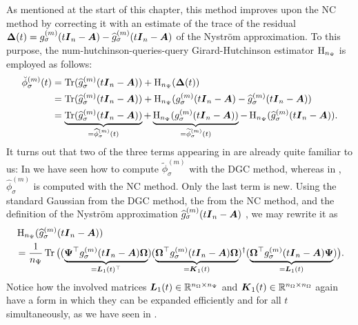 As mentioned at the start of this chapter, this method improves
upon the \gls{NC} method by correcting it with an estimate of the trace of the
residual $\boldsymbol{\Delta}(t) = g_{\sigma}^{(m)}(t\boldsymbol{I}_n - \boldsymbol{A}) - \widehat{g}_{\sigma}^{(m)}(t\boldsymbol{I}_n - \boldsymbol{A})$
of the Nystr\"om approximation. To this purpose, the \gls{num-hutchinson-queries}-query
Girard-Hutchinson estimator $\operatorname{H}_{n_{\Psi}}$
 is employed as follows:
\begin{align}
    \breve{\phi}_{\sigma}^{(m)}(t)
    &= \operatorname{Tr}(\widehat{g}_{\sigma}^{(m)}(t\boldsymbol{I}_n - \boldsymbol{A}))
    + \operatorname{H}_{n_{\Psi}}(\boldsymbol{\Delta}(t)) \notag \\
    &= \operatorname{Tr}(\widehat{g}_{\sigma}^{(m)}(t\boldsymbol{I}_n - \boldsymbol{A}))
    + \operatorname{H}_{n_{\Psi}}(g_{\sigma}^{(m)}(t\boldsymbol{I}_n - \boldsymbol{A}) - \widehat{g}_{\sigma}^{(m)}(t\boldsymbol{I}_n - \boldsymbol{A})) \notag \\
    &= \underbrace{\operatorname{Tr}(\widehat{g}_{\sigma}^{(m)}(t\boldsymbol{I}_n - \boldsymbol{A}))}_{=\widehat{\phi}_{\sigma}^{(m)}(t)}
    + \underbrace{\operatorname{H}_{n_{\Psi}}(g_{\sigma}^{(m)}(t\boldsymbol{I}_n - \boldsymbol{A}))}_{=\widetilde{\phi}_{\sigma}^{(m)}(t)}
    - \operatorname{H}_{n_{\Psi}}(\widehat{g}_{\sigma}^{(m)}(t\boldsymbol{I}_n - \boldsymbol{A})).
    \label{equ:4-nystromchebyshev-spectral-density-decomposition}
\end{align}
It turns out that two of the three terms appearing in 
are already quite familiar to us: In  we have seen
how to compute $\widetilde{\phi}_{\sigma}^{(m)}$ with the \gls{DGC} method, whereas
in , $\widehat{\phi}_{\sigma}^{(m)}$ is computed with the \gls{NC}
method. Only the last term is new. Using the standard Gaussian 
from the \gls{DGC} method, the  from the \gls{NC} method,
and the definition of the Nystr\"om approximation
$\widehat{g}_{\sigma}^{(m)}(t\boldsymbol{I}_n - \boldsymbol{A})$ ,
we may rewrite it as
\begin{align*}
    &\operatorname{H}_{n_{\Psi}}(\widehat{g}_{\sigma}^{(m)}(t\boldsymbol{I}_n - \boldsymbol{A}))\\
    &=\frac{1}{n_{\Psi}}\operatorname{Tr}\big(
        (\underbrace{\boldsymbol{\Psi}^{\top} g_{\sigma}^{(m)}(t\boldsymbol{I}_n - \boldsymbol{A}) \boldsymbol{\Omega}}_{=\boldsymbol{L}_1(t)^{\top}})
        (\underbrace{\boldsymbol{\Omega}^{\top} g_{\sigma}^{(m)}(t\boldsymbol{I}_n - \boldsymbol{A}) \boldsymbol{\Omega}}_{=\boldsymbol{K}_1(t)})^{\dagger}
        (\underbrace{\boldsymbol{\Omega}^{\top} g_{\sigma}^{(m)}(t\boldsymbol{I}_n - \boldsymbol{A}) \boldsymbol{\Psi}}_{=\boldsymbol{L}_1(t)})
    \big).
\end{align*}
Notice how the involved matrices $\boldsymbol{L}_1(t) \in \mathbb{R}^{n_{\Omega} \times n_{\Psi}}$ and $\boldsymbol{K}_1(t) \in \mathbb{R}^{n_{\Omega} \times n_{\Omega}}$
again have a form in which they can be expanded efficiently and for all $t$ simultaneously,
as we have seen in .\\

